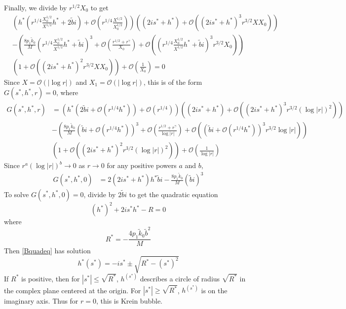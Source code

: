 \documentclass[thesis.tex]{subfiles}
\begin{document}
Finally, we divide by $r^{1/2}X_0$ to get 
\begin{equation}\label{Bsimple6}
\begin{aligned}
&\left( h^* \left( r^{1/4}\frac{X_0^{1/2}}{X^{1/2}} h^* + 2 \tilde{b} i \right) + \mathcal{O}\left( r^{1/4} \frac{X^{1/2}}{X_0^{1/2}} \right)\right)
\left( (2 i s^* + h^*) + \mathcal{O}\left( (2 i s^* + h^*)^3 r^{3/2} X X_0 \right) \right) \\ 
&- \left(\frac{8 p_1 \tilde{k}_0}{M} \left( r^{1/4}\frac{X_0^{1/2}}{X^{1/2}} h^* + \tilde{b}i\right)^3 + \mathcal{O}\left( \frac{r^{1/2} + r^{\gamma}}{X_0} \right) + \mathcal{O}\left( \left(r^{1/4}\frac{X_0^{1/2}}{X^{1/2}} h^* + \tilde{b}i \right)^3 r^{3/2} X_0  \right) \right) \\
&\left( 1 + \mathcal{O}\left( (2 i s^* + h^*)^2 r^{3/2} X X_0 \right) \right) + \mathcal{O}\left( \frac{1}{X_0} \right) = 0
\end{aligned}
\end{equation}
Since $X = \mathcal{O}(|\log r|)$ and $X_1 = \mathcal{O}(|\log r|)$, this is of the form $G(s^*, h^*, r) = 0$, where
\begin{equation}\label{BsimpleG}
\begin{aligned}
G(s^*, h^*, r) &=
\left( h^* \left( 2 \tilde{b} i + \mathcal{O}(r^{1/4} h^*) \right) + \mathcal{O}\left( r^{1/4} \right)\right)
\left( (2 i s^* + h^*) + \mathcal{O}\left( (2 i s^* + h^*)^3 r^{3/2} (\log|r|)^2 \right) \right) \\ 
&- \left(\frac{8 p_1 \tilde{k}_0}{M} \left( \tilde{b} i + \mathcal{O}(r^{1/4} h^*) \right)^3 + \mathcal{O}\left( \frac{r^{1/2} + r^{\gamma}}{\log|r|} \right) + \mathcal{O}\left( \left( \tilde{b} i + \mathcal{O}(r^{1/4} h^*) \right)^3 r^{3/2} \log|r|  \right) \right) \\
&\left( 1 + \mathcal{O}\left( (2 i s^* + h^*)^2 r^{3/2} (\log|r|)^2 \right) \right) + \mathcal{O}\left( \frac{1}{\log|r|} \right)
\end{aligned}
\end{equation}
Since $r^{a}(\log|r|)^b \rightarrow 0$ as $r \rightarrow 0$ for any positive powers $a$ and $b$, 
\begin{equation}\label{BsimpleG0}
\begin{aligned}
G(s^*, h^*, 0) &= 2 (2 i s^* + h^*) h^* \tilde{b} i  - \frac{8 p_1 \tilde{k}_0}{M} (\tilde{b} i)^3 
\end{aligned}
\end{equation}
To solve $G(s^*, h^*, 0) = 0$, divide by $2 \tilde{b} i$ to get the quadratic equation
\begin{equation}\label{Bquadeq}
(h^*)^2 + 2 i s^* h^* - R = 0
\end{equation}
where 
\[
R^* = -\frac{4 p_1 \tilde{k}_0 \tilde{b}^2 }{M}
\]
Then \cref{Bquadeq} has solution
\begin{equation}\label{Bquadsol}
h^*(s^*) = -i s^* \pm \sqrt{R^* - (s^*)^2 }
\end{equation}
If $R^*$ is positive, then for $|s^*| \leq \sqrt{R^*}$, $h^(s^*)$ describes a circle of radius $\sqrt{R^*}$ in the complex plane centered at the origin. For $|s^*| \geq \sqrt{R^*}$, $h^(s^*)$ is on the imaginary axis. Thus for $r = 0$, this is Krein bubble. 
\end{document}
